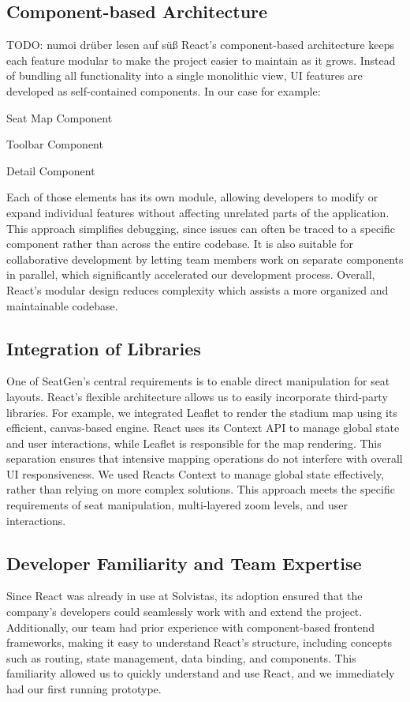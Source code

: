 \subsection{Component-based Architecture}
TODO: numoi drüber lesen auf süß
React’s component-based architecture keeps each feature modular to make the project easier to maintain as it grows. Instead of bundling all functionality into a single monolithic view, UI features are developed as self-contained components. In our case for example:
\begin{compactitem}
    \item Seat Map Component
    \item Toolbar Component
    \item Detail Component
\end{compactitem}
Each of those elements has its own module, allowing developers to modify or expand individual features without affecting unrelated parts of the application. This approach simplifies debugging, since issues can often be traced to a specific component rather than across the entire codebase. It is also suitable for collaborative development by letting team members work on separate components in parallel, which significantly accelerated our development process. Overall, React’s modular design reduces complexity which assists a more organized and maintainable codebase.
~\cite{ReactCBA01, ReactCBA02, ReactCBA03}

\subsection{Integration of Libraries}
One of SeatGen’s central requirements is to enable direct manipulation for seat layouts. React’s flexible architecture 
allows us to easily incorporate third-party libraries. For example, we integrated Leaflet to render the stadium map using its efficient, canvas-based engine. React uses its Context API to manage global state and user interactions, while Leaflet is responsible for the map rendering. This separation ensures that intensive mapping operations do not interfere with overall UI responsiveness. We used Reacts Context to manage global state effectively, rather than relying on more complex solutions. This approach meets the specific requirements of seat manipulation, multi-layered zoom levels, and user interactions.

\subsection{Developer Familiarity and Team Expertise}
Since React was already in use at Solvistas, its adoption ensured that the company’s developers could seamlessly work with and extend the project. Additionally, our team had prior experience with component-based frontend frameworks, making it easy to understand React’s structure, including concepts such as routing, state management, data binding, and components. This familiarity allowed us to quickly understand and use React, and we immediately had our first running prototype.
